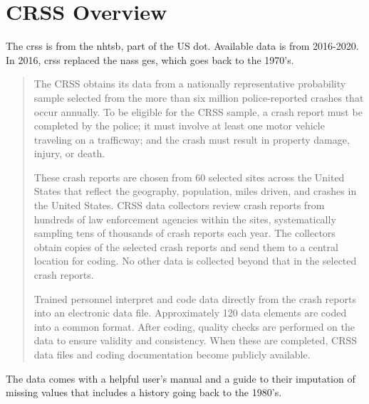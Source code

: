 \section{CRSS Overview}

The \acrfull{crss} \cite{CRSS} is from the \acrfull{nhtsb}, part of the US \acrfull{dot}.  Available data is from 2016-2020.  In 2016, \acrshort{crss} replaced the \acrfull{nass ges}, which goes back to the 1970's.  

\begin{quote}
The CRSS obtains its data from a nationally representative probability sample selected from the more than six million police-reported crashes that occur annually. To be eligible for the CRSS sample, a crash report must be completed by the police; it must involve at least one motor vehicle traveling on a trafficway; and the crash must result in property damage, injury, or death.

These crash reports are chosen from 60 selected sites across the United States that reflect the geography, population, miles driven, and crashes in the United States. CRSS data collectors review crash reports from hundreds of law enforcement agencies within the sites, systematically sampling tens of thousands of crash reports each year. The collectors obtain copies of the selected crash reports and send them to a central location for coding. No other data is collected beyond that in the selected crash reports.

Trained personnel interpret and code data directly from the crash reports into an electronic data file. Approximately 120 data elements are coded into a common format. After coding, quality checks are performed on the data to ensure validity and consistency. When these are completed, CRSS data files and coding documentation become publicly available. \cite{CRSS_Manual}
\end{quote}

The data comes with a helpful user's manual \cite{CRSS_Manual} and a guide to their imputation of missing values that includes a history going back to the 1980's. \cite{CRSS_Imputation}


